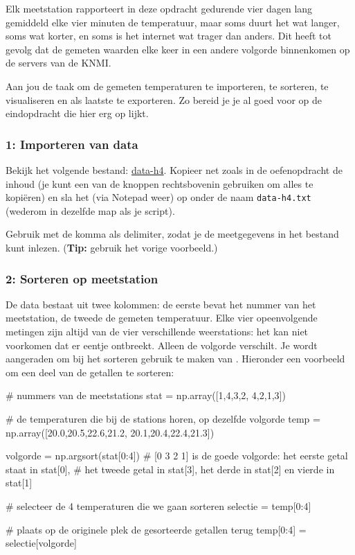\documentclass[a4paper,11pt, fleqn]{article}
\begin{document}
Elk meetstation rapporteert in deze opdracht gedurende vier dagen lang gemiddeld elke vier minuten de temperatuur, maar soms duurt het wat langer, soms wat korter, en soms is het internet wat trager dan anders. Dit heeft tot gevolg dat de gemeten waarden elke keer in een andere volgorde binnenkomen op de servers van de KNMI.

Aan jou de taak om de gemeten temperaturen te importeren, te sorteren, te visualiseren en als laatste te exporteren. Zo bereid je je al goed voor op de eindopdracht die hier erg op lijkt.

\subsubsection*{1: Importeren van data}
Bekijk het volgende bestand:
\href{https://github.com/Ichthus-College-IN/Python-x-Meet-je-leefomgeving/tree/main/inc/data_h4.txt}{data-h4}. Kopieer net zoals in de oefenopdracht de inhoud (je kunt een van de knoppen rechtsbovenin gebruiken om alles te kopi\"eren) en sla het (via Notepad weer) op onder de naam \verb,data-h4.txt, (wederom in dezelfde map als je script).

Gebruik  met de komma als delimiter, zodat je de meetgegevens in het bestand kunt inlezen. ({\bf Tip:} gebruik het vorige voorbeeld.)

\subsubsection*{2: Sorteren op meetstation}
De data bestaat uit twee kolommen: de eerste bevat het nummer van het meetstation, de tweede de gemeten temperatuur. Elke vier opeenvolgende metingen zijn altijd van de vier verschillende weerstations: het kan niet voorkomen dat er eentje ontbreekt. Alleen de volgorde verschilt. Je wordt aangeraden om bij het sorteren gebruik te maken van . Hieronder een voorbeeld om een deel van de getallen te sorteren:

\begin{python}
# nummers van de meetstations
stat = np.array([1,4,3,2, 4,2,1,3])

# de temperaturen die bij de stations horen, op dezelfde volgorde
temp = np.array([20.0,20.5,22.6,21.2, 20.1,20.4,22.4,21.3])

volgorde = np.argsort(stat[0:4])
# [0 3 2 1] is de goede volgorde: het eerste getal staat in stat[0],
# het tweede getal in stat[3], het derde in stat[2] en vierde in stat[1]

# selecteer de 4 temperaturen die we gaan sorteren
selectie = temp[0:4]

# plaats op de originele plek de gesorteerde getallen terug
temp[0:4] = selectie[volgorde]
\end{python}
\end{document}
